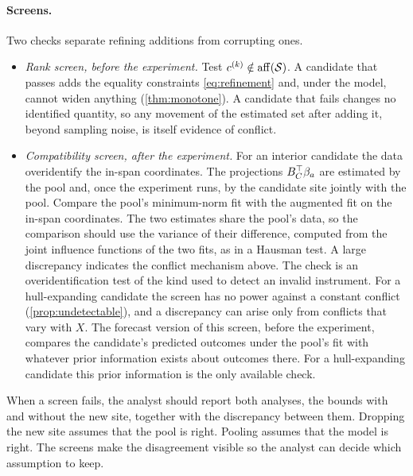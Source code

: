 \paragraph{Screens.}
Two checks separate refining additions from corrupting ones.
\begin{itemize}
\item \emph{Rank screen, before the experiment.} Test
  $c^{(k)}\notin\operatorname{aff}(\mathcal S)$. A candidate that passes adds the
  equality constraints \eqref{eq:refinement} and, under the model,
  cannot widen anything (\cref{thm:monotone}). A candidate that fails
  changes no identified quantity, so any movement of the estimated set
  after adding it, beyond sampling noise, is itself evidence of
  conflict.
\item \emph{Compatibility screen, after the experiment.} For an
  interior candidate the data overidentify the in-span coordinates. The
  projections $B_C^\top\beta_a$ are estimated by the pool and, once
  the experiment runs, by the candidate site jointly with the pool.
  Compare the pool's minimum-norm fit with the augmented fit on the
  in-span coordinates. The two estimates share the pool's data, so the
  comparison should use the variance of their difference, computed from
  the joint influence functions of the two fits, as in a Hausman test. A
  large discrepancy indicates the conflict mechanism above. The check is
  an overidentification test of the kind used to detect an invalid
  instrument. For a hull-expanding candidate the screen has no power
  against a constant conflict (\cref{prop:undetectable}), and a
  discrepancy can arise only from conflicts that vary with $X$. The
  forecast version of this screen, before the experiment, compares the
  candidate's predicted outcomes under the pool's fit with whatever
  prior information exists about outcomes there. For a hull-expanding
  candidate this prior information is the only available check.
\end{itemize}
When a screen fails, the analyst should report both analyses, the bounds
with and without the new site, together with the discrepancy between
them. Dropping the new site assumes that the pool is right. Pooling
assumes that the model is right. The screens make the disagreement
visible so the analyst can decide which assumption to keep.
